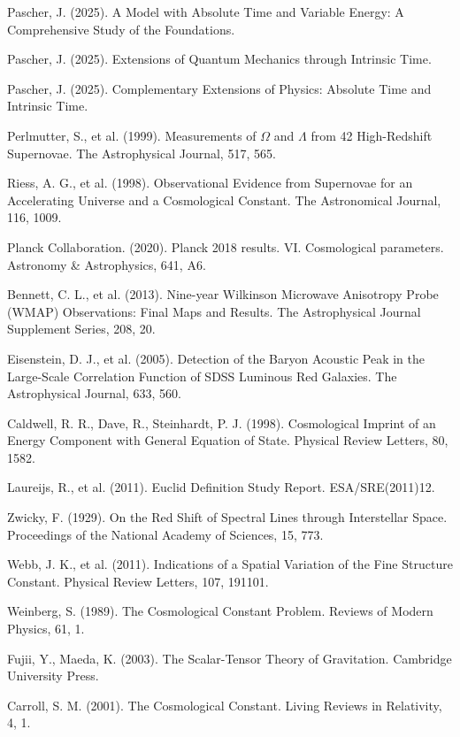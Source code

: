 \documentclass[a4paper,12pt]{article}
\begin{document}
\begin{thebibliography}{99}
	
	 Pascher, J. (2025). A Model with Absolute Time and Variable Energy: A Comprehensive Study of the Foundations.
	
	 Pascher, J. (2025). Extensions of Quantum Mechanics through Intrinsic Time.
	
	 Pascher, J. (2025). Complementary Extensions of Physics: Absolute Time and Intrinsic Time.
	
	 Perlmutter, S., et al. (1999). Measurements of $\Omega$ and $\Lambda$ from 42 High-Redshift Supernovae. The Astrophysical Journal, 517, 565.
	
	 Riess, A. G., et al. (1998). Observational Evidence from Supernovae for an Accelerating Universe and a Cosmological Constant. The Astronomical Journal, 116, 1009.
	
	 Planck Collaboration. (2020). Planck 2018 results. VI. Cosmological parameters. Astronomy \& Astrophysics, 641, A6.
	
	 Bennett, C. L., et al. (2013). Nine-year Wilkinson Microwave Anisotropy Probe (WMAP) Observations: Final Maps and Results. The Astrophysical Journal Supplement Series, 208, 20.
	
	 Eisenstein, D. J., et al. (2005). Detection of the Baryon Acoustic Peak in the Large-Scale Correlation Function of SDSS Luminous Red Galaxies. The Astrophysical Journal, 633, 560.
	
	 Caldwell, R. R., Dave, R., Steinhardt, P. J. (1998). Cosmological Imprint of an Energy Component with General Equation of State. Physical Review Letters, 80, 1582.
	
	 Laureijs, R., et al. (2011). Euclid Definition Study Report. ESA/SRE(2011)12.
	
	 Zwicky, F. (1929). On the Red Shift of Spectral Lines through Interstellar Space. Proceedings of the National Academy of Sciences, 15, 773.
	
	 Webb, J. K., et al. (2011). Indications of a Spatial Variation of the Fine Structure Constant. Physical Review Letters, 107, 191101.
	
	 Weinberg, S. (1989). The Cosmological Constant Problem. Reviews of Modern Physics, 61, 1.
	
	 Fujii, Y., Maeda, K. (2003). The Scalar-Tensor Theory of Gravitation. Cambridge University Press.
	
	 Carroll, S. M. (2001). The Cosmological Constant. Living Reviews in Relativity, 4, 1.
	
\end{thebibliography}
\end{document}
